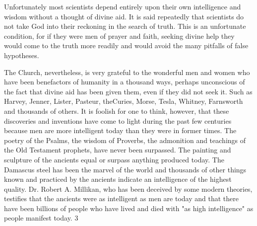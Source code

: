 Unfortunately most scientists depend entirely upon their own intelligence and wisdom
without a thought of divine aid. It is said repeatedly that scientists do not take God into their
reckoning in the search of truth. This is an unfortunate condition, for if they were men of
prayer and faith, seeking divine help they would come to the truth more readily and would
avoid the many pitfalls of false hypotheses.

The Church, nevertheless, is very grateful to the wonderful men and women who have been
benefactors of humanity in a thousand ways, perhaps unconscious of the fact that divine aid
has been given them, even if they did not seek it. Such as Harvey, Jenner, Lister, Pasteur, theCuries, Morse, Tesla, Whitney, Farnsworth and thousands of others. It is foolish for one to
think, however, that these discoveries and inventions have come to light during the past few
centuries because men are more intelligent today than they were in former times. The poetry
of the Psalms, the wisdom of Proverbs, the admonition and teachings of the Old Testament
prophets, have never been surpassed. The painting and sculpture of the ancients equal or
surpass anything produced today. The Damascus steel has been the marvel of the world and
thousands of other things known and practiced by the ancients indicate an intelligence of the
highest quality. Dr. Robert A. Millikan, who has been deceived by some modern theories,
testifies that the ancients were as intelligent as men are today and that there have been
billions of people who have lived and died with "as high intelligence" as people manifest
today. 3

